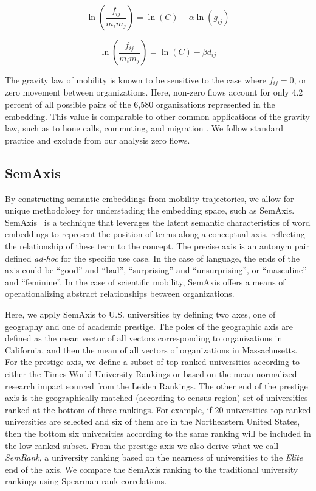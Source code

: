 \documentclass[12pt]{article} %
\begin{document}
\begin{equation}
	\label{eq:linear_flux_geo}
	\ln(\frac{f_{ij}}{m_im_j}) = \ln(C)  - \alpha \ln(g_{ij})
\end{equation}

\begin{equation}
	\label{eq:linear_flux_emb}
	\ln(\frac{f_{ij}}{m_im_j}) = \ln(C) - \beta d_{ij}
\end{equation}

The gravity law of mobility is known to be sensitive to the case where $f_{ij} = 0$, or zero movement between organizations. 
Here, non-zero flows account for only 4.2 percent of all possible pairs of  the 6,580 organizations represented in the embedding.
This value is comparable to other common applications of the gravity law, such as to hone calls, commuting, and migration \autocite{simini2012universal}.
We follow standard practice and exclude from our analysis zero flows. 


%
%
\subsection*{SemAxis}
By constructing semantic embeddings from mobility trajectories, we allow for unique methodology for understading the embedding space, such as SemAxis.
SemAxis~\autocite{an2018semaxis} is a technique that leverages the latent semantic characteristics of word embeddings to represent the position of terms along a conceptual axis, reflecting the relationship of these term to the concept. 
The precise axis is an antonym pair defined \textit{ad-hoc} for the specific use case.
In the case of language, the ends of the axis could be ``good'' and ``bad'', ``surprising'' and ``unsurprising'', or ``masculine'' and ``feminine''. 
In the case of scientific mobility, SemAxis offers a means of operationalizing abstract relationships between organizations.

Here, we apply SemAxis to U.S. universities by defining two axes, one of geography and one of academic prestige. 
The poles of the geographic axis are defined as the mean vector of all vectors corresponding to organizations in California, and then the mean of all vectors of organizations in Massachusetts. 
For the prestige axis, we define a subset of top-ranked universities according to either the Times World University Rankings or based on the mean normalized research impact sourced from the Leiden Rankings. 
The other end of the prestige axis is the geographically-matched (according to census region) set of universities ranked at the bottom of these rankings.
For example, if 20 universities top-ranked universities are selected and six of them are in the Northeastern United States, then the bottom six universities according to the same ranking will be included in the low-ranked subset. 
From the prestige axis we also derive what we call \textit{SemRank}, a university ranking based on the nearness of universities to the \textit{Elite} end of the axis. 
We compare the SemAxis ranking to the traditional university rankings using Spearman rank correlations. 
\end{document}
